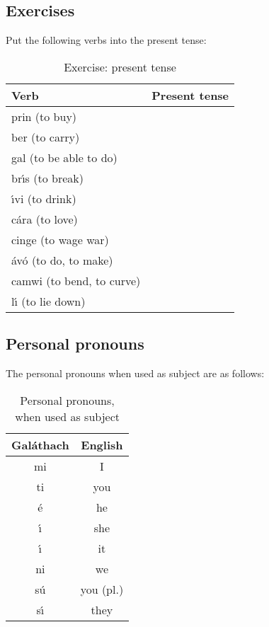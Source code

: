 \subsection{Exercises}
\noindent Put the following verbs into the present tense:
\begin{table}[H]
\begin{center}
    \begin{tabu}{|l|p{10.0cm}|}
  \toprule
  \textbf{Verb} & \textbf{Present tense}\\
  \toprule
  prin (to buy) & \\
  \midrule
  ber (to carry) & \\
  \midrule
  gal (to be able to do) & \\
  \midrule
  br\'{\i}s (to break) & \\
  \midrule
  \'{\i}vi (to drink) & \\
  \midrule
  c\'{a}ra (to love) & \\
  \midrule
  cinge (to wage war) & \\
  \midrule
  \'{a}v\'{o} (to do, to make) & \\
  \midrule
  camwi (to bend, to curve) & \\
  \midrule
  l\'{\i} (to lie down) & \\
  \bottomrule
\end{tabu}
\end{center}
\caption{Exercise: present tense}
\label{exercise_present_tense}
\end{table}

\subsection{Personal pronouns}

\noindent The personal pronouns when used as subject are as follows:
\begin{table}[H]
\begin{center}
\begin{tabu}{c|c}
  \toprule
  Galáthach & English\\
  \toprule
  mi & I \\
  ti & you\\
  \'{e} & he\\
  \'{\i} & she\\
  \'{\i} & it\\
  ni & we\\
  s\'{u} & you (pl.)\\
  s\'{\i} & they\\
  \bottomrule
\end{tabu}
\end{center}
\caption{Personal pronouns, when used as subject}
\label{personal_pronouns_as_subject}
\end{table}

